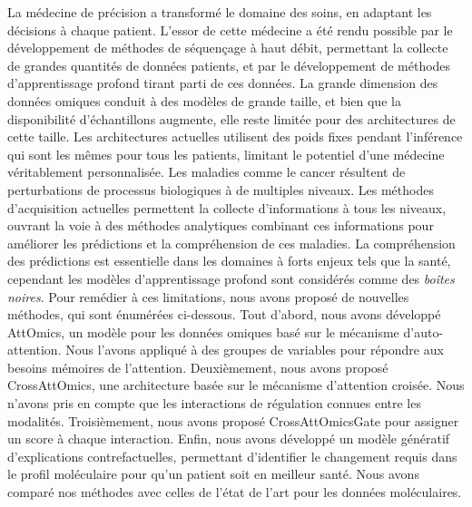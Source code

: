 La médecine de précision a transformé le domaine des soins, en adaptant les décisions à chaque patient.
L'essor de cette médecine a été rendu possible par le développement de méthodes de séquençage à haut débit, permettant la collecte de grandes quantités de données patients, et par le développement de méthodes d'apprentissage profond tirant parti de ces données.
La grande dimension des données omiques conduit à des modèles de grande taille, et bien que la disponibilité d'échantillons augmente, elle reste limitée pour des architectures de cette taille.
Les architectures actuelles utilisent des poids fixes pendant l'inférence qui sont les mêmes pour tous les patients, limitant le potentiel d'une médecine véritablement personnalisée.
Les maladies comme le cancer résultent de perturbations de processus biologiques à de multiples niveaux.
Les méthodes d'acquisition actuelles permettent la collecte d'informations à tous les niveaux, ouvrant la voie à des méthodes analytiques combinant ces informations pour améliorer les prédictions et la compréhension de ces maladies.
La compréhension des prédictions est essentielle dans les domaines à forts enjeux tels que la santé, cependant les modèles d'apprentissage profond sont considérés comme des \textit{boîtes noires}.
Pour remédier à ces limitations, nous avons proposé de nouvelles méthodes, qui sont énumérées ci-dessous.
Tout d'abord, nous avons développé AttOmics, un modèle pour les données omiques basé sur le mécanisme d'auto-attention.
Nous l'avons appliqué à des groupes de variables pour répondre aux besoins mémoires de l'attention.
Deuxièmement, nous avons proposé CrossAttOmics, une architecture basée sur le mécanisme d'attention croisée.
Nous n'avons pris en compte que les interactions de régulation connues entre les modalités.
Troisièmement, nous avons proposé CrossAttOmicsGate pour assigner un score à chaque interaction.
Enfin, nous avons développé un modèle génératif d'explications contrefactuelles, permettant d'identifier le changement requis dans le profil moléculaire pour qu'un patient soit en meilleur santé.
Nous avons comparé nos méthodes avec celles de l'état de l'art pour les données moléculaires.